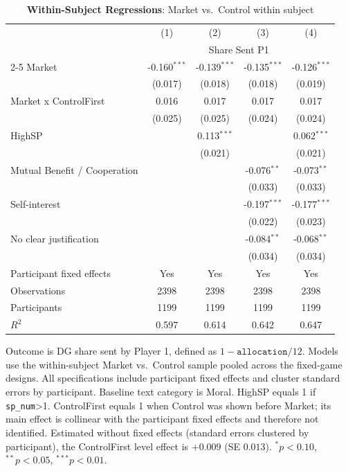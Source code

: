 \begin{table}[!htbp]
\centering
\caption{\textbf{Within-Subject Regressions}: Market vs.\ Control within subject}
\label{tab:within_market_regressions}
\begin{tabular}{lcccc}
\toprule
 & (1) & (2) & (3) & (4) \\
 & \multicolumn{4}{c}{Share Sent P1} \\
\cmidrule(lr){2-5}
\midrule
Market & -0.160$^{***}$ & -0.139$^{***}$ & -0.135$^{***}$ & -0.126$^{***}$ \\
 & (0.017) & (0.018) & (0.018) & (0.019) \\
Market x ControlFirst & 0.016 & 0.017 & 0.017 & 0.017 \\
 & (0.025) & (0.025) & (0.024) & (0.024) \\
HighSP &  & 0.113$^{***}$ &  & 0.062$^{***}$ \\
 &  & (0.021) &  & (0.021) \\
Mutual Benefit / Cooperation &  &  & -0.076$^{**}$ & -0.073$^{**}$ \\
 &  &  & (0.033) & (0.033) \\
Self-interest &  &  & -0.197$^{***}$ & -0.177$^{***}$ \\
 &  &  & (0.022) & (0.023) \\
No clear justification &  &  & -0.084$^{**}$ & -0.068$^{**}$ \\
 &  &  & (0.034) & (0.034) \\
Participant fixed effects & Yes & Yes & Yes & Yes \\
Observations & 2398 & 2398 & 2398 & 2398 \\
Participants & 1199 & 1199 & 1199 & 1199 \\
$R^2$ & 0.597 & 0.614 & 0.642 & 0.647 \\
\bottomrule
\end{tabular}
\begin{flushleft}
\footnotesize Outcome is DG share sent by Player 1, defined as $1-\texttt{allocation}/12$. Models use the within-subject Market vs.\ Control sample pooled across the fixed-game designs. All specifications include participant fixed effects and cluster standard errors by participant. Baseline text category is Moral. HighSP equals 1 if \texttt{sp\_num}>1. ControlFirst equals 1 when Control was shown before Market; its main effect is collinear with the participant fixed effects and therefore not identified. Estimated without fixed effects (standard errors clustered by participant), the ControlFirst level effect is $+0.009$ (SE $0.013$). $^{*}p<0.10$, $^{**}p<0.05$, $^{***}p<0.01$.
\end{flushleft}
\end{table}
